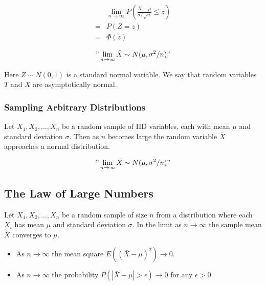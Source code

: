 \begin{align*}
      & \lim_{n\to\infty} P\left(\frac{\bar{X}-\mu}{\sigma/\sqrt{n}}\leq z\right) \\
    = & P(Z=z)                                                                    \\
    = & \Phi(z)
\end{align*}

$$"\lim_{n\to\infty}\bar{X}\sim N(\mu,\sigma^2/n)"$$

Here $Z\sim N(0,1)$ is a standard normal variable. We say that random  variables $T$ and $\bar{X}$ are asymptotically normal.

\subsubsection*{Sampling Arbitrary Distributions}

Let $X_1, X_2, \ldots, X_n$ be a random sample of IID variables, each with mean $\mu$ and standard deviation $\sigma$.
Then as $n$ becomes large the random variable $\bar{X}$ approaches a normal distribution.

$$"\lim_{n\to\infty}\bar{X}\sim N(\mu,\sigma^2/n)"$$

\subsection*{The Law of Large Numbers}

Let $X_1,X_2,\ldots,X_n$ be a random sample of size $n$ from a distribution where each $X_i$ has mean $\mu$ and standard deviation $\sigma$.
In the limit as $n\to \infty$ the sample mean $\bar{X}$ converges to $\mu$.

\begin{itemize}
    \item As $n\to\infty$ the mean square $E((\bar{X}-\mu)^2)\to 0$.
    \item As $n\to\infty$ the probability $P(|\bar{X}-\mu|>\epsilon)\to 0$ for any $\epsilon>0$.
\end{itemize}


